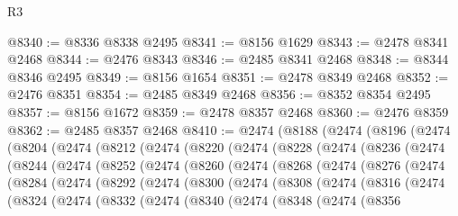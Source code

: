 \begin{lexlean}{R3}
\begin{coremodule}
@8340 := @8336 @8338 @2495
@8341 := @8156 @1629
@8343 := @2478 @8341 @2468
@8344 := @2476 @8343
@8346 := @2485 @8341 @2468
@8348 := @8344 @8346 @2495
@8349 := @8156 @1654
@8351 := @2478 @8349 @2468
@8352 := @2476 @8351
@8354 := @2485 @8349 @2468
@8356 := @8352 @8354 @2495
@8357 := @8156 @1672
@8359 := @2478 @8357 @2468
@8360 := @2476 @8359
@8362 := @2485 @8357 @2468
@8410 := @2474
    (@8188
      (@2474
        (@8196
          (@2474
            (@8204
              (@2474
                (@8212
                  (@2474
                    (@8220
                      (@2474
                        (@8228
                          (@2474
                            (@8236
                              (@2474
                                (@8244
                                  (@2474
                                    (@8252
                                      (@2474
                                        (@8260
                                          (@2474
                                            (@8268
                                              (@2474
                                                (@8276
                                                  (@2474
                                                    (@8284
                                                      (@2474
                                                        (@8292
                                                          (@2474
                                                            (@8300
                                                              (@2474
                                                                (@8308
                                                                  (@2474
                                                                    (@8316
                                                                      (@2474
                                                                        (@8324
                                                                          (@2474
                                                                            (@8332
                                                                              (@2474
                                                                                (@8340
                                                                                  (@2474
                                                                                    (@8348
                                                                                      (@2474
                                                                                        (@8356

\end{coremodule}
\end{lexlean}
